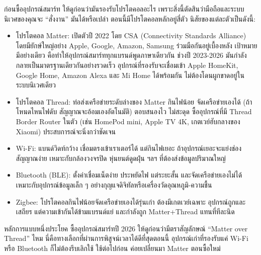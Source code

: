 


ก่อนซื้ออุปกรณ์สมาร์ท ให้ดูก่อนว่ามันรองรับโปรโตคอลอะไร เพราะสิ่งนี้ตัดสินว่ามือถือและระบบนิเวศของคุณจะ “สั่งงาน” มันได้หรือเปล่า ตอนนี้มีโปรโตคอลหลักอยู่สี่ตัว นิสัยของแต่ละตัวเป็นดังนี้:

\begin{itemize}
  \item โปรโตคอล Matter: เปิดตัวปี 2022 โดย CSA (Connectivity Standards Alliance) โดยมียักษ์ใหญ่อย่าง Apple, Google, Amazon, Samsung ร่วมมือกันอยู่เบื้องหลัง เป้าหมายมีอย่างเดียว คือทำให้อุปกรณ์สมาร์ททุกแบรนด์พูดภาษาเดียวกัน ช่วงปี 2023-2026 มันกำลังกลายเป็นมาตรฐานเดียวกันอย่างรวดเร็ว อุปกรณ์ที่รองรับจะเชื่อมเข้า Apple HomeKit, Google Home, Amazon Alexa และ Mi Home ได้พร้อมกัน ไม่ต้องโดนผูกขาดอยู่ในระบบนิเวศเดียว
  \item โปรโตคอล Thread: ท่อส่งเครือข่ายระดับล่างของ Matter กินไฟน้อย จัดเครือข่ายเองได้ (ถ้าโหนดไหนไฟดับ สัญญาณจะอ้อมเองอัตโนมัติ) ตอบสนองไว ไม่สะดุด ซื้ออุปกรณ์ที่มี Thread Border Router ในตัว (เช่น HomePod mini, Apple TV 4K, เกตเวย์ฮับกลางของ Xiaomi) ประสบการณ์จะนิ่งกว่าชัดเจน
  \item Wi-Fi: แบนด์วิดท์กว้าง เชื่อมตรงเข้าเราเตอร์ได้ แต่กินไฟเยอะ ถ้าอุปกรณ์เยอะจะแย่งช่องสัญญาณง่าย เหมาะกับกล้องวงจรปิด หุ่นยนต์ดูดฝุ่น ฯลฯ ที่ต้องส่งข้อมูลปริมาณใหญ่
  \item Bluetooth (BLE): ตั้งค่าเชื่อมเน็ตง่าย ประหยัดไฟ แต่ระยะสั้น และจัดเครือข่ายเองไม่ได้ เหมาะกับอุปกรณ์ข้อมูลเล็ก ๆ อย่างกุญแจดิจิทัลหรือเครื่องวัดอุณหภูมิ-ความชื้น
  \item Zigbee: โปรโตคอลกินไฟน้อยจัดเครือข่ายเองได้รุ่นเก๋า ต้องมีเกตเวย์เฉพาะ อุปกรณ์ถูกและเสถียร แต่ความเข้ากันได้ข้ามแบรนด์แย่ และกำลังถูก Matter+Thread แทนที่ทีละนิด
\end{itemize}

\begin{tcbinfo}{หลักการแบบหนึ่งประโยค}
ซื้ออุปกรณ์สมาร์ทปี 2026 ให้ดูก่อนว่ามีตราสัญลักษณ์ “Matter over Thread” ไหม นี่คือทางเลือกที่ผ่านการพิสูจน์เวลาได้ดีที่สุดตอนนี้ อุปกรณ์เก่าที่รองรับแค่ Wi-Fi หรือ Bluetooth ก็ไม่ต้องรีบเลิกใช้ ใช้ต่อไปก่อน ค่อยเปลี่ยนมา Matter ตอนซื้อใหม่

\end{tcbinfo}

